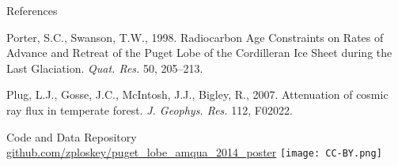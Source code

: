 \documentclass{beamer}
\begin{document}
\begin{frame}{}
\begin{columns}[T]
\begin{column}{.32\columnwidth}
\begin{block}{References}
\begin{itemize}
{\item Porter, S.C., Swanson, T.W., 1998. Radiocarbon Age Constraints on Rates of Advance and Retreat of the Puget Lobe of the Cordilleran Ice Sheet during the Last Glaciation. \emph{Quat. Res.} 50, 205--213.

\item Plug, L.J., Gosse, J.C., McIntosh, J.J., Bigley, R., 2007. Attenuation of cosmic ray flux in temperate forest. \emph{J. Geophys. Res.} 112, F02022.

} %
\end{itemize}

\end{block}

\begin{block}{Code and Data Repository}
\center \url{github.com/zploskey/puget_lobe_amqua_2014_poster}
\texttt{[image: CC-BY.png]}
\end{block}

\end{column}

\end{columns}

\end{frame}
\end{document}

